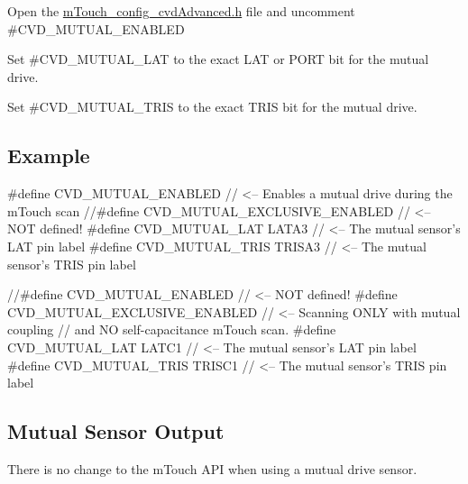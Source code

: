 \begin{DoxyEnumerate}
\item Open the \hyperlink{m_touch__config__cvd_advanced_8h}{m\+Touch\+\_\+config\+\_\+cvd\+Advanced.\+h} file and uncomment \#\+C\+V\+D\+\_\+\+M\+U\+T\+U\+A\+L\+\_\+\+E\+N\+A\+B\+L\+E\+D 
\item Set \#\+C\+V\+D\+\_\+\+M\+U\+T\+U\+A\+L\+\_\+\+L\+A\+T to the exact L\+A\+T or P\+O\+R\+T bit for the mutual drive. 
\item Set \#\+C\+V\+D\+\_\+\+M\+U\+T\+U\+A\+L\+\_\+\+T\+R\+I\+S to the exact T\+R\+I\+S bit for the mutual drive. 
\end{DoxyEnumerate}\hypertarget{feat_mutual_featMutual-Ex}{}\subsection{Example}\label{feat_mutual_featMutual-Ex}

\begin{DoxyCode}
\textcolor{preprocessor}{#define CVD\_MUTUAL\_ENABLED                        // <-- Enables a mutual drive during the mTouch scan}
\textcolor{comment}{//#define CVD\_MUTUAL\_EXCLUSIVE\_ENABLED            // <-- NOT defined!}
\textcolor{preprocessor}{#define CVD\_MUTUAL\_LAT                    LATA3   // <-- The mutual sensor's LAT pin label}
\textcolor{preprocessor}{#define CVD\_MUTUAL\_TRIS                   TRISA3  // <-- The mutual sensor's TRIS pin label}
\end{DoxyCode}
 
\begin{DoxyCode}
\textcolor{comment}{//#define CVD\_MUTUAL\_ENABLED                      // <-- NOT defined!}
\textcolor{preprocessor}{#define CVD\_MUTUAL\_EXCLUSIVE\_ENABLED              // <-- Scanning ONLY with mutual coupling }
                                                  \textcolor{comment}{//      and NO self-capacitance mTouch scan.}
\textcolor{preprocessor}{#define CVD\_MUTUAL\_LAT                    LATC1   // <-- The mutual sensor's LAT pin label}
\textcolor{preprocessor}{#define CVD\_MUTUAL\_TRIS                   TRISC1  // <-- The mutual sensor's TRIS pin label}
\end{DoxyCode}
\hypertarget{feat_mutual_featMutual-Out}{}\subsection{Mutual Sensor Output}\label{feat_mutual_featMutual-Out}
There is no change to the m\+Touch A\+P\+I when using a mutual drive sensor. 